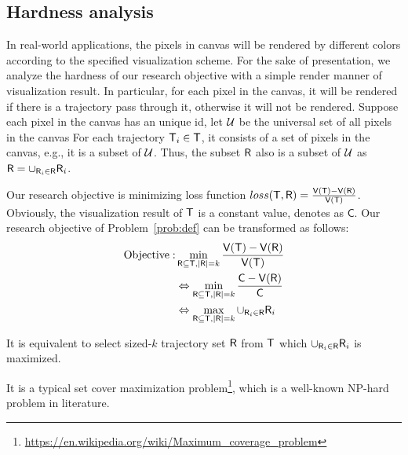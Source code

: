 


\subsection{Hardness analysis}\label{sec:hard}
In real-world applications, the pixels in canvas will be rendered by different colors according to the specified visualization scheme.
For the sake of presentation, we analyze the hardness of our research objective with a simple render manner of visualization result.
In particular, for each pixel in the canvas, it will be rendered if there is a trajectory pass through it, otherwise it will not be rendered.
Suppose each pixel in the canvas has an unique id, let $\mathcal{U}$ be the universal set of all pixels in the canvas
For each trajectory $\mathsf{T}_i \in \mathsf{T}$, it consists of a set of pixels in the canvas, e.g., it is a subset of $\mathcal{U}$.
Thus, the subset $\mathsf{R}$ also is a subset of $\mathcal{U}$ as $\mathsf{R} = \cup_{\mathsf{R}_i \in \mathsf{R}} \mathsf{R}_i$.

Our research objective is minimizing loss function $loss(\mathsf{T}, \mathsf{R}) =  \frac{\mathsf{V}(\mathsf{T}) - \mathsf{V}(\mathsf{R})}{\mathsf{V}(\mathsf{T})}$.
Obviously, the visualization result of $\mathsf{T}$ is a constant value, denotes as $\mathsf{C}$.
Our research objective of Problem~\ref{prob:def} can be transformed as follows:
\begin{align}\label{eqn:obj2} \nonumber
\text{Objective}: & \min_{\mathsf{R} \subseteq \mathsf{T}, |\mathsf{R}| = k}  \frac{\mathsf{V}(\mathsf{T}) - \mathsf{V}(\mathsf{R})}{\mathsf{V}(\mathsf{T})} \\ \nonumber
& \Leftrightarrow \min_{\mathsf{R} \subseteq \mathsf{T}, |\mathsf{R}| = k}  \frac{\mathsf{C} - \mathsf{V}(\mathsf{R})}{\mathsf{C}} \\ \nonumber
& \Leftrightarrow \max_{\mathsf{R} \subseteq \mathsf{T}, |\mathsf{R}| = k}  \cup_{\mathsf{R}_i \in \mathsf{R}} \mathsf{R}_i
\end{align}

It is equivalent to select sized-$k$ trajectory set $\mathsf{R}$ from $\mathsf{T}$ which $\cup_{\mathsf{R}_i \in \mathsf{R}} \mathsf{R}_i$ is maximized.

It is a typical set cover maximization problem\footnote{\url{https://en.wikipedia.org/wiki/Maximum_coverage_problem}}, which is a well-known NP-hard problem in literature.

